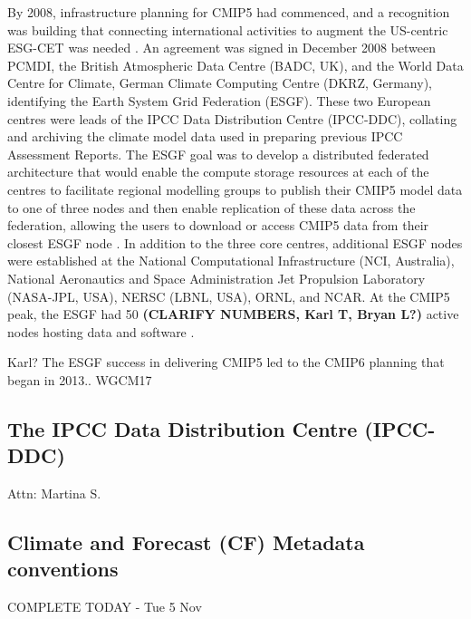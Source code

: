 \documentclass[gmd, preprint]{copernicus}
\newcommand{\mycomment}[1]{}
\def\cred#1{{\color{red}#1}}
\def\cblue#1{{\color{blue}#1}}
\begin{document}
By 2008, infrastructure planning for CMIP5 had commenced, and a recognition was building that connecting international activities to augment the US-centric ESG-CET was needed \citep{williams_global_2016}. An agreement was signed in December 2008 between PCMDI, the British Atmospheric Data Centre (BADC, UK), and the World Data Centre for Climate, German Climate Computing Centre (DKRZ, Germany), identifying the Earth System Grid Federation (ESGF). These two European centres were leads of the IPCC Data Distribution Centre (IPCC-DDC), collating and archiving the climate model data used in preparing previous IPCC Assessment Reports. The ESGF goal was to develop a distributed federated architecture that would enable the compute storage resources at each of the centres to facilitate regional modelling groups to publish their CMIP5 model data to one of three nodes and then enable replication of these data across the federation, allowing the users to download or access CMIP5 data from their closest ESGF node \citep{williams_earth_2011}. In addition to the three core centres, additional ESGF nodes were established at the National Computational Infrastructure (NCI, Australia), National Aeronautics and Space Administration Jet Propulsion Laboratory (NASA-JPL, USA), NERSC (LBNL, USA), ORNL, and NCAR. At the CMIP5 peak, the ESGF had 50 \cred{\textbf{(CLARIFY NUMBERS, Karl T, Bryan L?)}} active nodes hosting data and software \citep{williams_global_2016}.
\mycomment{
CMIP6 current nodes - https://aims2.llnl.gov/nodes
Very early CMIP5 http://web.archive.org/web/20111015000202/http://pcmdi3.llnl.gov/esgcet/home.htm 7 nodes ESG-CET + BADC, WDCC, NCI
ESG-CET NCAR, LLNL, ORNL https://extranet.gfdl.noaa.gov/~vb/curator/AR5-20071017/ESG-CET200710.pdf Oct 2007
2013 Aspen workshop - https://www.wcrp-climate.org/images/modelling/WGCM/WGCM17/WGCM17_report.pdf;
Middleton, Foster and Williams et al., 2006: Earth System Grid II final report 2001-2006 SCIDAC https://www.osti.gov/servlets/purl/1113798 https://doi.org/10.2172/1113798
}
\cred{Karl? The ESGF success in delivering CMIP5 led to the CMIP6 planning that began in 2013.. WGCM17}


\subsection{The IPCC Data Distribution Centre (IPCC-DDC)}
\label{sec:IPCC-DDC}
\cred{Attn: Martina S.}
\citep{stockhause_cmip6_2017,stockhause_twenty-five_2022}


\subsection{Climate and Forecast (CF) Metadata conventions}
\label{sec:CFConventions}
\cblue{COMPLETE TODAY - Tue 5 Nov}
\end{document}
